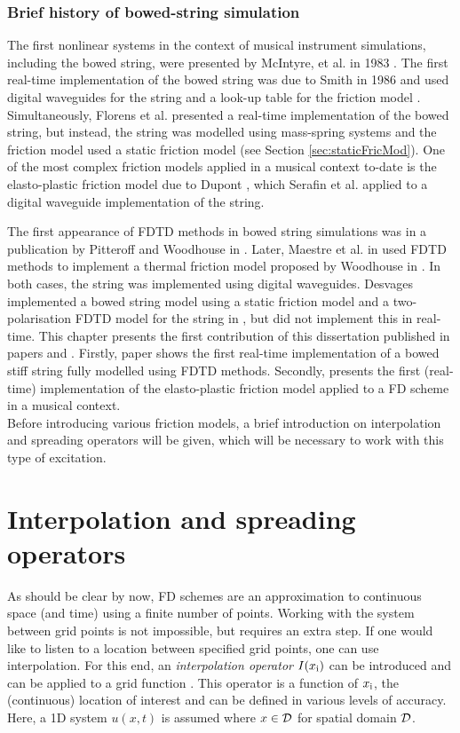 \subsubsection{Brief history of bowed-string simulation}
The first nonlinear systems in the context of musical instrument simulations, including the bowed string, were presented by McIntyre, et al. in 1983 \cite{McIntyre1983}. The first real-time implementation of the bowed string was due to Smith in 1986 and used digital waveguides for the string and a look-up table for the friction model \cite{Smith1986}. Simultaneously, Florens et al. presented a real-time implementation of the bowed string, but instead, the string was modelled using mass-spring systems and the friction model used a static friction model \cite{Florens1986} (see Section \ref{sec:staticFricMod}). One of the most complex friction models applied in a musical context to-date is the elasto-plastic friction model due to Dupont \cite{Dupont2002}, which Serafin et al. \cite{Serafin2003, Serafin2004} applied to a digital waveguide implementation of the string. 

The first appearance of FDTD methods in bowed string simulations was in a publication by Pitteroff and Woodhouse in \cite{Pitteroff1998}. Later, Maestre et al. in \cite{Maestre2014} used FDTD methods to implement a thermal friction model proposed by Woodhouse in \cite{Woodhouse2003}. In both cases, the string was implemented using digital waveguides. Desvages implemented a bowed string model using a static friction model and a two-polarisation FDTD model for the string in \cite{Desvages2016, Desvages2018}, but did not implement this in real-time. This chapter presents the first contribution of this dissertation published in papers \citeP[A] and \citeP[C]. Firstly, paper \citeP[A] shows the first real-time implementation of a bowed stiff string fully modelled using FDTD methods. Secondly, \citeP[C] presents the first (real-time) implementation of the elasto-plastic friction model applied to a FD scheme in a musical context.
\\

Before introducing various friction models, a brief introduction on interpolation and spreading operators will be given, which will be necessary to work with this type of excitation.

\section{Interpolation and spreading operators}\label{sec:interpolationSpreading}
As should be clear by now, FD schemes are an approximation to continuous space (and time) using a finite number of points. Working with the system between grid points is not impossible, but requires an extra step. If one would like to listen to a location between specified grid points, one can use interpolation. For this end, an \textit{interpolation operator} $I(x_{\text{i}})$ can be introduced and can be applied to a grid function \cite{theBible}. This operator is a function of $x_{\text{i}}$, the (continuous) location of interest and can be defined in various levels of accuracy. Here, a 1D system $u(x,t)$ is assumed where $x\in \mathcal{D}$ for spatial domain $\mathcal{D}$.


